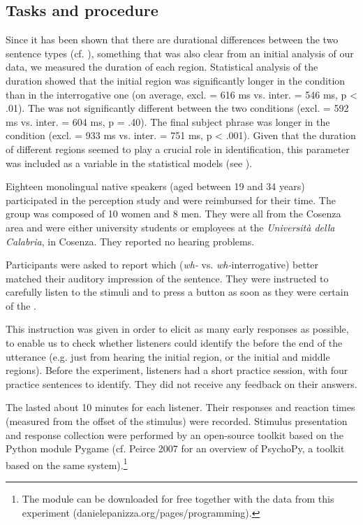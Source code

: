 \documentclass[output=paper]{langsci/langscibook}
\begin{document}
  
\subsection{Tasks and procedure}
\label{sec:kel:4.2}

Since it has been shown that there are durational differences between the two sentence types (cf. \citealt{Sorianello2011exclamative}), something that was also clear from an initial analysis of our data, we measured the duration of each region. Statistical analysis of the duration showed that the initial region was significantly longer in the  condition than in the interrogative one (on average, excl. = 616 ms vs. inter. = 546 ms, p < .01). The  was not significantly different between the two conditions (excl. = 592 ms vs. inter. = 604 ms, p = .40). The final subject phrase was longer in the  condition (excl. = 933 ms vs. inter. = 751 ms, p < .001). Given that the duration of different regions seemed to play a crucial role in identification, this parameter was included as a variable in the statistical models (see ).  

Eighteen monolingual  native speakers (aged between 19 and 34 years) participated in the perception study and were reimbursed for their time. The group was composed of 10 women and 8 men. They were all from the Cosenza area and were either university students or employees at the \textit{Università della Calabria}, in Cosenza. They reported no hearing problems.

Participants were asked to report which  (\textit{wh-} vs. \textit{wh-}interrogative) better matched their auditory impression of the sentence. They were instructed to carefully listen to the stimuli and to press a button as soon as they were certain of the . 

This instruction was given in order to elicit as many early responses as possible, to enable us to check whether listeners could identify the  before the end of the utterance (e.g. just from hearing the initial region, or the initial and middle regions). Before the experiment, listeners had a short practice session, with four practice sentences to identify. They did not receive any feedback on their answers. 

The  lasted about 10 minutes for each listener. Their responses and reaction times (measured from the offset of the stimulus) were re\-cor\-ded. Stimulus presentation and response collection were performed by an open-source toolkit based on the Python module Pygame (cf. Peirce 2007 for an overview of PsychoPy, a toolkit based on the same system).\footnote{The module can be downloaded for free together with the data from this experiment (danielepanizza.org/pages/programming).}
\end{document}
